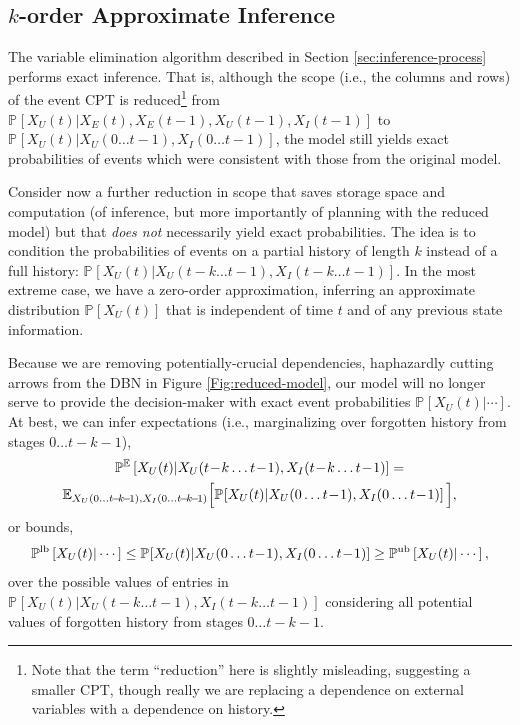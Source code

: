 \documentclass[10pt]{article}
\newcommand{\PP}[2][]{\mathbb{P\!}_{#1}\left[#2\right]}
\newcommand{\PPe}[2][]{\mathbb{P}^\mathbb{E}_{#1}\left[#2\right]}
\newcommand{\PPlb}[2][]{\mathbb{P}^\text{lb}_{#1}\left[#2\right]}
\newcommand{\PPub}[2][]{\mathbb{P}^\text{ub}_{#1}\left[#2\right]}
\begin{document}
\subsection{$k$-order Approximate Inference}

The variable elimination algorithm described in Section \ref{sec:inference-process} performs exact inference.   That is, although the scope (i.e., the columns and rows) of the event CPT is reduced\footnote{Note that the term ``reduction'' here is slightly misleading, suggesting a smaller CPT, though really we are replacing a dependence on external variables with a dependence on history.}   from $\PP{X_{U}(t)|X_{E}(t),X_{E}(t\!-\!1),X_{U}(t\!-\!1),X_{I}(t\!-\!1)}$ to $\PP{X_{U}(t)|X_{U}(0\ldots t\!-\!1),X_{I}(0\ldots t\!-\!1)}$, the model still yields exact probabilities of 
events which were consistent with those from the original model.

Consider now a further reduction in scope that saves storage space and computation (of inference, but more importantly of planning with the reduced model) but that \emph{does not} necessarily yield exact probabilities.  The idea is to condition the probabilities of events on a partial history of length $k$ instead of a full history: $\PP{X_{U}(t)|X_{U}(t\!-\!k\ldots t\!-\!1),X_{I}(t\!-\!k\ldots t\!-\!1)}$.  In the most extreme case, we have a zero-order approximation, inferring an approximate distribution $\PP{X_{U}(t)}$ that is independent of time $t$ and of any previous state information.

Because we are removing potentially-crucial dependencies, haphazardly cutting arrows from the DBN in Figure \ref{Fig:reduced-model}, our model will no longer serve to provide the decision-maker with exact event probabilities $\PP{X_{U}(t)|\cdots}$.  At best, we can infer expectations (i.e., marginalizing over forgotten history from stages $0\dots t\!-\!k\!-\!1$),
\begin{multline}
\small
\PPe{X_{U}(t)|X_{U}(t\!-\!k\ldots t\!-\!1),X_{I}(t\!-\!k\ldots t\!-\!1)} =\\
\mathbb{E}_{
X_{U}(0\dots t\!-\!k\!-\!1),X_{I}(0\dots t\!-\!k\!-\!1)
}\Big[ \PP{X_{U}(t)|X_{U}(0\ldots t\!-\!1),X_{I}(0\ldots t\!-\!1)} \Big],
\end{multline}
or bounds,
\begin{equation}
\small
\PPlb{X_{U}(t)|\cdots} \leq 
\PP{X_{U}(t)|X_{U}(0\ldots t\!-\!1),X_{I}(0\ldots t\!-\!1)}
\geq \PPub{X_{U}(t)|\cdots},
\end{equation}
over the possible values of entries in $\PP{X_{U}(t)|X_{U}(t\!-\!k\ldots t\!-\!1),X_{I}(t\!-\!k\ldots t\!-\!1)}$ considering all potential values of forgotten history from stages $0\dots t\!-\!k\!-\!1$.
\end{document}
